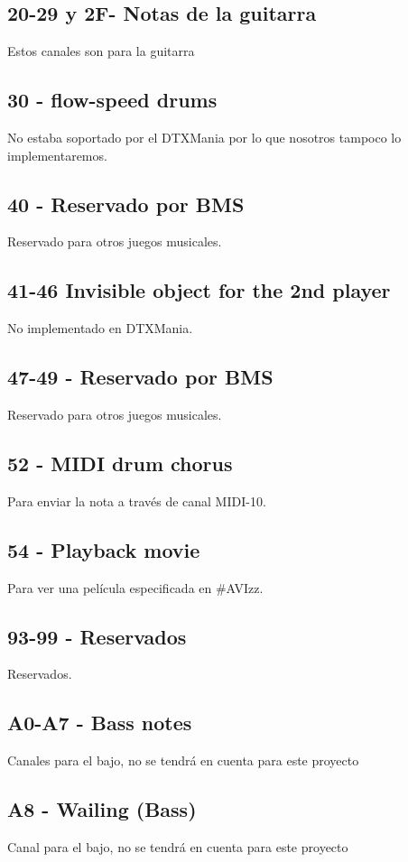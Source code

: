 \documentclass[a4paper,11pt,oneside]{book}
\begin{document}
\subsection{20-29 y 2F- Notas de la guitarra}
Estos canales son para la guitarra

\subsection{30 - flow-speed drums}
No estaba soportado por el DTXMania por lo que nosotros tampoco lo implementaremos.

\subsection{40 - Reservado por BMS}
Reservado para otros juegos musicales.

\subsection{41-46 Invisible object for the 2nd player}
No implementado en DTXMania.

\subsection{47-49 - Reservado por BMS}
Reservado para otros juegos musicales.

\subsection{52 - MIDI drum chorus}
Para enviar la nota a través de canal MIDI-10.

\subsection{54 - Playback movie}
Para ver una película especificada en \#AVIzz.


\subsection{93-99 - Reservados}
Reservados.

\subsection{A0-A7 - Bass notes}
Canales para el bajo, no se tendrá en cuenta para este proyecto

\subsection{A8 - Wailing (Bass)}
Canal para el bajo, no se tendrá en cuenta para este proyecto
\end{document}
